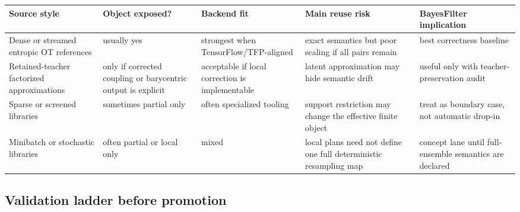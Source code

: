 \begin{center}
\scriptsize
\setlength{\tabcolsep}{3pt}
\begin{tabular}{@{}p{} p{} p{} p{} p{}@{}}
\toprule
Source style & Object exposed? & Backend fit & Main reuse risk & BayesFilter implication \\
\midrule
Dense or streamed entropic OT references & usually yes & strongest when TensorFlow/TFP-aligned & exact semantics but poor scaling if all pairs remain & best correctness baseline \\
Retained-teacher factorized approximations & only if corrected coupling or barycentric output is explicit & acceptable if local correction is implementable & latent approximation may hide semantic drift & useful only with teacher-preservation audit \\
Sparse or screened libraries & sometimes partial only & often specialized tooling & support restriction may change the effective finite object & treat as boundary case, not automatic drop-in \\
Minibatch or stochastic libraries & often partial or local only & mixed & local plans need not define one full deterministic resampling map & concept lane until full-ensemble semantics are declared \\
\bottomrule
\end{tabular}
\setlength{\tabcolsep}{6pt}
\normalsize
\end{center}

\subsection{Validation ladder before promotion}
\label{sec:bf-dpf-debug-validation-ladder}

